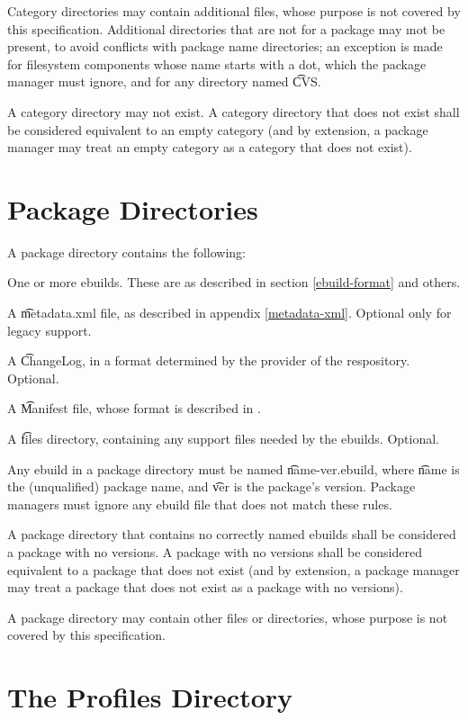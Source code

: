 Category directories may contain additional files, whose purpose is not covered by this
specification. Additional directories that are not for a package may \i{not} be present, to avoid
conflicts with package name directories; an exception is made for filesystem components whose name
starts with a dot, which the package manager must ignore, and for any directory named \t{CVS}.

A category directory may not exist. A category directory that does not exist shall be considered
equivalent to an empty category (and by extension, a package manager may treat an empty category as
a category that does not exist).

\section{Package Directories}
\label{package-dirs}

A package directory contains the following:
\begin{bulletlist}
\item One or more ebuilds. These are as described in section \ref{ebuild-format} and others.
\item A \t{metadata.xml} file, as described in appendix \ref{metadata-xml}\@. Optional only for
    legacy support.
\item A \t{ChangeLog}, in a format determined by the provider of the respository. Optional.
\item A \t{Manifest} file, whose format is described in \cite{Glep44}.
\item A \t{files} directory, containing any support files needed by the ebuilds. Optional.
\end{bulletlist}

Any ebuild in a package directory must be named \t{name-ver.ebuild}, where \t{name} is the
(unqualified) package name, and \t{ver} is the package's version. Package managers must ignore
any ebuild file that does not match these rules.

A package directory that contains no correctly named ebuilds shall be considered a package with no
versions. A package with no versions shall be considered equivalent to a package that does not
exist (and by extension, a package manager may treat a package that does not exist as a package
with no versions).

A package directory may contain other files or directories, whose purpose is not covered by
this specification.

\section{The Profiles Directory}
\label{profiles-dir}

